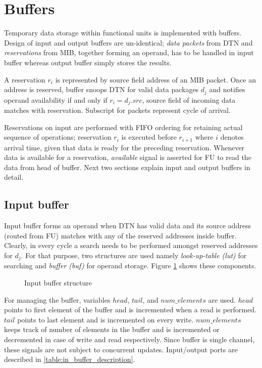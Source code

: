 \section{Buffers}
	Temporary data storage within functional units is implemented with buffers. Design of input and output buffers are un-identical; \textit{data packets} from DTN and \textit{reservations} from MIB, together forming an operand, has to be handled in input buffer whereas output buffer simply stores the results. 
	
	
	A reservation $r_i$ is represented by source field address of an MIB packet. Once an address is reserved, buffer snoops DTN for valid data packages $d_j$ and notifies operand availability if and only if $r_i = d_j.src$, \ie \hspace{1pt} source field of incoming data matches with reservation. Subscript for packets represent cycle of arrival.
	
	Reservations on input are performed with FIFO ordering for retaining actual sequence of operations; reservation $r_i$ is executed before $r_{i+1}$ where $i$ denotes arrival time, given that data is ready for the preceding reservation. Whenever data is available for a reservation, \textit{available} signal is asserted for FU to read the data from head of buffer.  
	 Next two sections explain input and output buffers in detail.
	
	\subsection{Input buffer}
	Input buffer forms an operand when DTN has valid data and its source address (routed from FU) matches with any of the reserved addresses inside buffer. Clearly, in every cycle a search needs to be performed amongst reserved addresses for $d_j$. For that purpose, two structures are used namely \textit{look-up-table (lut)} for searching and \textit{buffer (buf)} for operand storage. Figure \ref{fig:input_buffer} shows these components.
	
	\begin{figure}[htbp]
		\centering
		\def\svgwidth{\columnwidth}
		
		\caption{Input buffer structure}
		\label{fig:input_buffer} 
	\end{figure}
	
	For managing the buffer, variables $head$, $tail$, and $num\_elements$ are used. $head$ points to first element of the buffer and is incremented when a read is performed. $tail$ points to last element and is incremented on every write. $num\_elements$ keeps track of number of elements in the buffer and is incremented or decremented in case of write and read respectively. Since buffer is single channel, these signals are not subject to concurrent updates. Input/output ports are described in \ref{table:in_buffer_description}.
	
